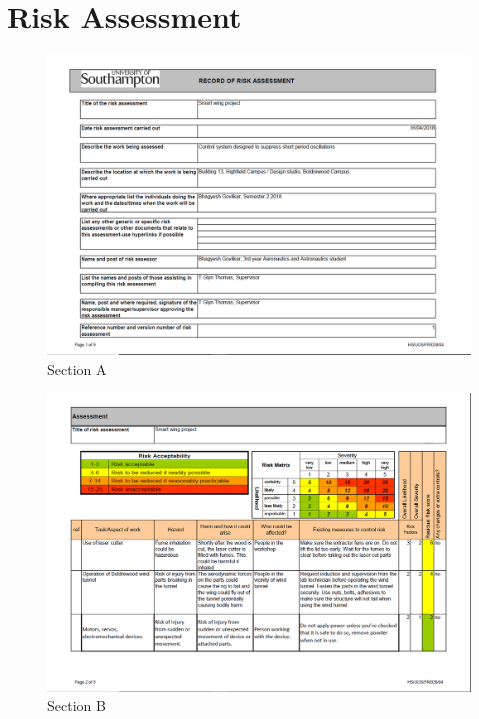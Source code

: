 \chapter{Risk Assessment} %
\thispagestyle{fancy}
\begin{figure}[H]
\centering
\includegraphics[scale=0.5]{ra1.png}
\caption{Section A}
\centering
\end{figure}
\newpage
\begin{figure}
\centering
\includegraphics[scale=0.6]{ra2.png}
\caption{Section B}
\centering
\end{figure}
\newpage
